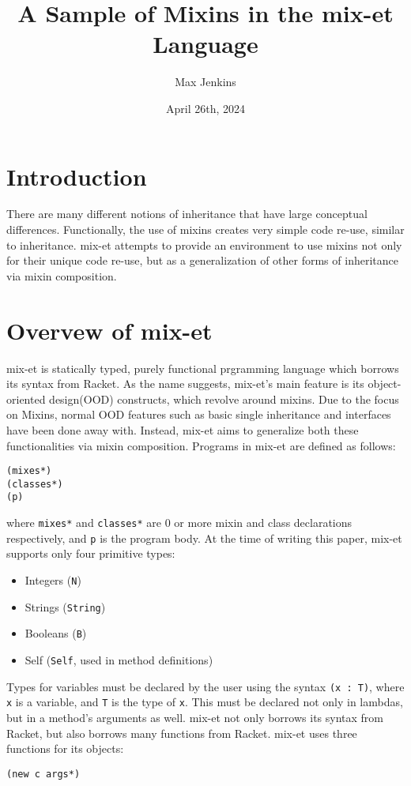 \documentclass{article}
\title{A Sample of Mixins in the mix-et Language}
\date{April 26th, 2024}
\author{Max Jenkins}
\begin{document}
\maketitle  
\section*{Introduction}  
\par
There are many different notions of inheritance that have large conceptual differences\cite{taivaalsari1996}. Functionally, the use of mixins creates very simple code re-use, similar to inheritance. mix-et attempts to provide an environment to use mixins not only for their unique code re-use, but as a generalization of other forms of inheritance via mixin composition. 
\section*{Overvew of mix-et}
\label{sec:overview}

mix-et is statically typed, purely functional prgramming language which borrows its syntax from Racket. 
As the name suggests, mix-et's main feature is its object-oriented design(OOD) constructs, which revolve around mixins.
Due to the focus on Mixins, normal OOD features such as basic single inheritance and interfaces have been done away with.
Instead, mix-et aims to generalize both these functionalities via mixin composition.
\newline
Programs in mix-et are defined as follows:
\begin{verbatim}
(mixes*)
(classes*)
(p)
\end{verbatim}

where \verb|mixes*| and \verb|classes*| are 0 or more mixin and class declarations respectively, and \verb|p| is the program body.
At the time of writing this paper, mix-et supports only four primitive types:
\begin{itemize} 
  
\item Integers (\verb|N|)
\item Strings (\verb|String|)
\item Booleans (\verb|B|)
\item Self (\verb|Self|, used in method definitions)
 
\end{itemize}
Types for variables must be declared by the user using the syntax \verb|(x : T)|, where \verb|x| is a variable, and \verb|T| is the type of \verb|x|. This must be declared not only in lambdas, but in a method's arguments as well.
mix-et not only borrows its syntax from Racket, but also borrows many functions from Racket. mix-et uses three functions for its objects:
\begin{verbatim}
(new c args*)
\end{verbatim}
\end{document}
